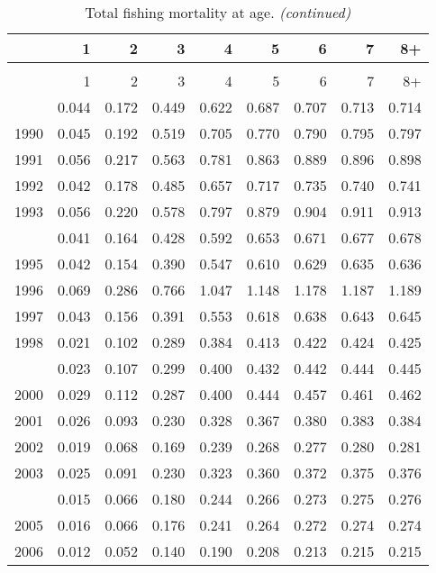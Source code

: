 \documentclass[
]{article}
\begin{document}
\begin{longtable}[t]{lrrrrrrrr}
\caption{\label{tab:FAA-tot-table}Total fishing mortality at age.}\\
\toprule
  & 1 & 2 & 3 & 4 & 5 & 6 & 7 & 8+\\
\midrule
\endfirsthead
\caption[]{Total fishing mortality at age. \textit{(continued)}}\\
\toprule
  & 1 & 2 & 3 & 4 & 5 & 6 & 7 & 8+\\
\midrule
\endhead

\endfoot
\bottomrule
\endlastfoot
1989 & 0.044 & 0.172 & 0.449 & 0.622 & 0.687 & 0.707 & 0.713 & 0.714\\
1990 & 0.045 & 0.192 & 0.519 & 0.705 & 0.770 & 0.790 & 0.795 & 0.797\\
1991 & 0.056 & 0.217 & 0.563 & 0.781 & 0.863 & 0.889 & 0.896 & 0.898\\
1992 & 0.042 & 0.178 & 0.485 & 0.657 & 0.717 & 0.735 & 0.740 & 0.741\\
1993 & 0.056 & 0.220 & 0.578 & 0.797 & 0.879 & 0.904 & 0.911 & 0.913\\
\addlinespace
1994 & 0.041 & 0.164 & 0.428 & 0.592 & 0.653 & 0.671 & 0.677 & 0.678\\
1995 & 0.042 & 0.154 & 0.390 & 0.547 & 0.610 & 0.629 & 0.635 & 0.636\\
1996 & 0.069 & 0.286 & 0.766 & 1.047 & 1.148 & 1.178 & 1.187 & 1.189\\
1997 & 0.043 & 0.156 & 0.391 & 0.553 & 0.618 & 0.638 & 0.643 & 0.645\\
1998 & 0.021 & 0.102 & 0.289 & 0.384 & 0.413 & 0.422 & 0.424 & 0.425\\
\addlinespace
1999 & 0.023 & 0.107 & 0.299 & 0.400 & 0.432 & 0.442 & 0.444 & 0.445\\
2000 & 0.029 & 0.112 & 0.287 & 0.400 & 0.444 & 0.457 & 0.461 & 0.462\\
2001 & 0.026 & 0.093 & 0.230 & 0.328 & 0.367 & 0.380 & 0.383 & 0.384\\
2002 & 0.019 & 0.068 & 0.169 & 0.239 & 0.268 & 0.277 & 0.280 & 0.281\\
2003 & 0.025 & 0.091 & 0.230 & 0.323 & 0.360 & 0.372 & 0.375 & 0.376\\
\addlinespace
2004 & 0.015 & 0.066 & 0.180 & 0.244 & 0.266 & 0.273 & 0.275 & 0.276\\
2005 & 0.016 & 0.066 & 0.176 & 0.241 & 0.264 & 0.272 & 0.274 & 0.274\\
2006 & 0.012 & 0.052 & 0.140 & 0.190 & 0.208 & 0.213 & 0.215 & 0.215\\

\end{longtable}
\end{document}
